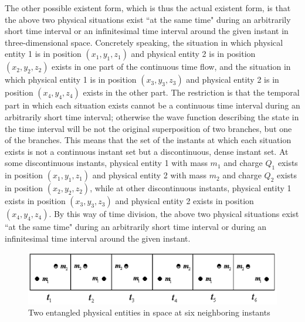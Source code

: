 
The other possible existent form, which is thus the actual existent form, is that the above two physical situations exist ``at the same time" during an arbitrarily short time interval or an infinitesimal time interval around the given instant in three-dimensional space.
Concretely speaking, the situation in which physical entity 1 is in position $(x_1,y_1,z_1)$ and physical entity 2 is in position $(x_2,y_2,z_2)$ exists in one part of the continuous time flow, and the situation in which physical entity 1 is in position $(x_3, y_3, z_3)$ and physical entity 2 is in position $(x_4, y_4, z_4)$ exists in the other part. The restriction is that the temporal part in which each situation exists cannot be a continuous time interval during an arbitrarily short time interval; otherwise the wave function describing the state in the time interval will be not the original superposition of two branches, but one of the branches. This means that the set of the instants at which each situation exists is not a continuous instant set but a discontinuous, dense instant set. %
At some discontinuous instants, physical entity 1 with mass $m_1$ and charge $Q_1$ exists in position $(x_1,y_1,z_1)$ and physical entity 2 with mass $m_2$ and charge $Q_2$ exists in position $(x_2,y_2,z_2)$, while at other discontinuous instants, physical entity 1 exists in position $(x_3, y_3, z_3)$ and physical entity 2 exists in position $(x_4, y_4, z_4)$. By this way of time division, the above two physical situations exist ``at the same time" during an arbitrarily short time interval or during an infinitesimal time interval around the given instant.

\begin{center} 
\begin{figure}[h]\label{schcat}

\includegraphics[scale=0.42]{fig71.jpg}


\caption{Two entangled physical entities in space at six neighboring instants}

\end{figure}

 \end{center} 

